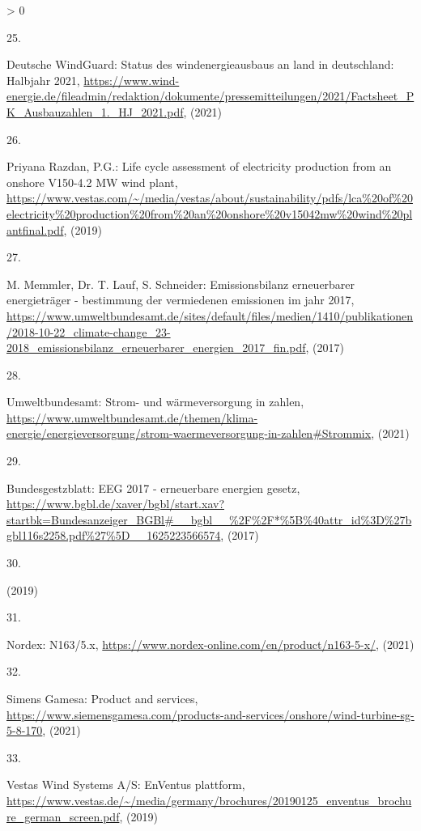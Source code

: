 \documentclass[a4paper,11pt]{article}
\newlength{\cslhangindent}
\newlength{\csllabelwidth}
\newenvironment{CSLReferences}[3] %
 {%
  \setlength{\parindent}{0pt}
  \ifodd #1 \everypar{\setlength{\hangindent}{\cslhangindent}}\ignorespaces\fi
  \ifnum #2 > 0
  \setlength{\parskip}{#2\baselineskip}
  \fi
 }%
 {}
\newcommand{\CSLLeftMargin}[1]{\parbox[t]{\maxof{\widthof{#1}}{\csllabelwidth}}{#1}}
\newcommand{\CSLRightInline}[1]{\parbox[t]{\linewidth}{#1}}
\begin{document}
\begin{CSLReferences}{0}{0}
\leavevmode\hypertarget{ref-DeutscheWindGuard.2021}{}%
\CSLLeftMargin{25. }
\CSLRightInline{Deutsche WindGuard: Status des windenergieausbaus an land in deutschland: Halbjahr 2021, \url{https://www.wind-energie.de/fileadmin/redaktion/dokumente/pressemitteilungen/2021/Factsheet_PK_Ausbauzahlen_1._HJ_2021.pdf}, (2021)}

\leavevmode\hypertarget{ref-PriyanaRazdan.2019}{}%
\CSLLeftMargin{26. }
\CSLRightInline{Priyana Razdan, P.G.: Life cycle assessment of electricity production from an onshore V150-4.2 MW wind plant, \url{https://www.vestas.com/~/media/vestas/about/sustainability/pdfs/lca\%20of\%20electricity\%20production\%20from\%20an\%20onshore\%20v15042mw\%20wind\%20plantfinal.pdf}, (2019)}

\leavevmode\hypertarget{ref-M.MemmlerDr.T.LaufS.Schneider.2017}{}%
\CSLLeftMargin{27. }
\CSLRightInline{M. Memmler, Dr. T. Lauf, S. Schneider: Emissionsbilanz erneuerbarer energietr{ä}ger - bestimmung der vermiedenen emissionen im jahr 2017, \url{https://www.umweltbundesamt.de/sites/default/files/medien/1410/publikationen/2018-10-22_climate-change_23-2018_emissionsbilanz_erneuerbarer_energien_2017_fin.pdf}, (2017)}

\leavevmode\hypertarget{ref-Umweltbundesamt.2021}{}%
\CSLLeftMargin{28. }
\CSLRightInline{Umweltbundesamt: Strom- und w{ä}rmeversorgung in zahlen, \url{https://www.umweltbundesamt.de/themen/klima-energie/energieversorgung/strom-waermeversorgung-in-zahlen\#Strommix}, (2021)}

\leavevmode\hypertarget{ref-Bundesgestzblatt.2017}{}%
\CSLLeftMargin{29. }
\CSLRightInline{Bundesgestzblatt: EEG 2017 - erneuerbare energien gesetz, \url{https://www.bgbl.de/xaver/bgbl/start.xav?startbk=Bundesanzeiger_BGBl\#__bgbl__\%2F\%2F*\%5B\%40attr_id\%3D\%27bgbl116s2258.pdf\%27\%5D__1625223566574}, (2017)}

\leavevmode\hypertarget{ref-EnergieagenturRheinlandPfalz.2019}{}%
\CSLLeftMargin{30. }
\CSLRightInline{(2019)}

\leavevmode\hypertarget{ref-Nordex.2021}{}%
\CSLLeftMargin{31. }
\CSLRightInline{Nordex: N163/5.x, \url{https://www.nordex-online.com/en/product/n163-5-x/}, (2021)}

\leavevmode\hypertarget{ref-SimensGamesa.2021}{}%
\CSLLeftMargin{32. }
\CSLRightInline{Simens Gamesa: Product and services, \url{https://www.siemensgamesa.com/products-and-services/onshore/wind-turbine-sg-5-8-170}, (2021)}

\leavevmode\hypertarget{ref-VestasWindSystemsAS.2019}{}%
\CSLLeftMargin{33. }
\CSLRightInline{Vestas Wind Systems A/S: EnVentus plattform, \url{https://www.vestas.de/~/media/germany/brochures/20190125_enventus_brochure_german_screen.pdf}, (2019)}


\end{CSLReferences}
\end{document}
